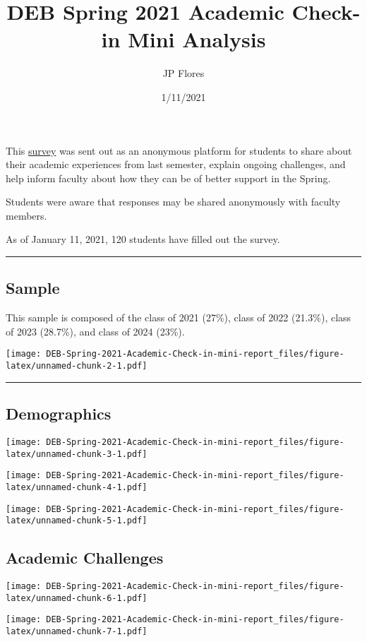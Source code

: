 \documentclass[
]{article}
\title{DEB Spring 2021 Academic Check-in Mini Analysis}
\author{JP Flores}
\date{1/11/2021}
\begin{document}
\maketitle

This
\href{https://docs.google.com/forms/d/1xsSR3A1MVAz2Ny47aP2rLM1xWB4bqMNMBovbOiUMHxA/edit}{survey}
was sent out as an anonymous platform for students to share about their
academic experiences from last semester, explain ongoing challenges, and
help inform faculty about how they can be of better support in the
Spring.

Students were aware that responses may be shared anonymously with
faculty members.

As of January 11, 2021, 120 students have filled out the survey.

\begin{center}\rule{0.5\linewidth}{0.5pt}\end{center}

\hypertarget{sample}{%
\subsection{Sample}\label{sample}}

This sample is composed of the class of 2021 (27\%), class of 2022
(21.3\%), class of 2023 (28.7\%), and class of 2024 (23\%).

\texttt{[image: DEB-Spring-2021-Academic-Check-in-mini-report\_files/figure-latex/unnamed-chunk-2-1.pdf]}

\begin{center}\rule{0.5\linewidth}{0.5pt}\end{center}

\hypertarget{demographics}{%
\subsection{Demographics}\label{demographics}}

\texttt{[image: DEB-Spring-2021-Academic-Check-in-mini-report\_files/figure-latex/unnamed-chunk-3-1.pdf]}

\texttt{[image: DEB-Spring-2021-Academic-Check-in-mini-report\_files/figure-latex/unnamed-chunk-4-1.pdf]}

\texttt{[image: DEB-Spring-2021-Academic-Check-in-mini-report\_files/figure-latex/unnamed-chunk-5-1.pdf]}

\hypertarget{academic-challenges}{%
\subsection{Academic Challenges}\label{academic-challenges}}

\texttt{[image: DEB-Spring-2021-Academic-Check-in-mini-report\_files/figure-latex/unnamed-chunk-6-1.pdf]}

\texttt{[image: DEB-Spring-2021-Academic-Check-in-mini-report\_files/figure-latex/unnamed-chunk-7-1.pdf]}
\end{document}
